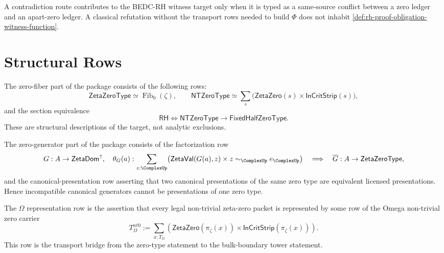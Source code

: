 \begin{principle}
\label{prin:rh-proof-obligation-refutation-data-typed}
A contradiction route contributes to the BEDC-RH witness target only when
it is typed as a same-source conflict between a zero ledger and an
apart-zero ledger. A classical refutation without the transport rows needed
to build $\Phi$ does not inhabit \autoref{def:rh-proof-obligation-witness-function}.
\end{principle}

\section{Structural Rows}
\label{sec:rh-proof-obligation-structural-rows}

\begin{definition}
\label{def:rh-proof-obligation-zero-fiber-rows}
The zero-fiber part of the package consists of the following rows:
$$
\mathsf{ZetaZeroType}\simeq\operatorname{Fib}_{0}(\zeta),
\qquad
\mathsf{NTZeroType}
\simeq
\sum_s
\bigl(
\mathsf{ZetaZero}(s)\times\mathsf{InCritStrip}(s)
\bigr),
$$
and the section equivalence
$$
\mathsf{RH}
\Longleftrightarrow
\mathsf{NTZeroType}\to\mathsf{FixedHalfZeroType}.
$$
These are structural descriptions of the target, not analytic exclusions.
\end{definition}

\begin{definition}
\label{def:rh-proof-obligation-zero-generator-rows}
The zero-generator part of the package consists of the factorization row
$$
G:A\to\mathsf{ZetaDom}^{\uparrow},
\quad
\theta_G(a):
\sum_{z:\ComplexUp}
\bigl(
\mathsf{ZetaVal}(G(a),z)
\times
z\sim_{\ComplexUp}e_{\ComplexUp}
\bigr)
\quad
\Longrightarrow
\quad
\overline G:A\to\mathsf{ZetaZeroType},
$$
and the canonical-presentation row asserting that two canonical
presentations of the same zero type are equivalent licensed
presentations. Hence incompatible canonical generators cannot be
presentations of one zero type.
\end{definition}

\begin{definition}
\label{def:rh-proof-obligation-omega-representation-row}
The $\Omega$ representation row is the assertion that every legal
non-trivial zeta-zero packet is represented by some row of the Omega
non-trivial zero carrier
$$
T_{\Omega}^{nt0}
:=
\sum_{x:T_{\Omega}}
\left(
\mathsf{ZetaZero}(\pi_{\zeta}(x))
\times
\mathsf{InCritStrip}(\pi_{\zeta}(x))
\right).
$$
This row is the transport bridge from the zero-type statement to the
bulk-boundary tower statement.
\end{definition}

